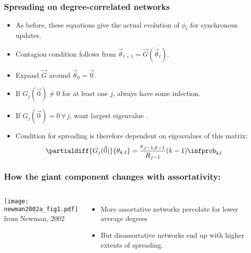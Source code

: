 \begin{frame}
  \frametitle{Spreading on degree-correlated networks}

  \begin{itemize}
  \item<1->
    As before, these equations give the actual evolution
    of $\phi_t$ for synchronous updates.
  \item<2->
    Contagion condition follows from $\vec{\theta}_{t+1} = \vec{G}(\vec{\theta}_{t})$.
  \item<3->
    Expand $\vec{G}$ around $\vec{\theta}_{0}=\vec{0}$.
  \item<5->
    If $G_j(\vec{0}) \ne 0$ for at least one $j$, always have some infection.
  \item<5->
    If $G_j(\vec{0}) = 0 \, \forall \, j$, want largest eigenvalue
    .
  \item<6-> 
    Condition for spreading is therefore
    dependent on eigenvalues of this matrix:
    $$
    \partialdiff{G_j(\vec{0})}{\theta_{k,t}} 
    = 
    \frac{e_{j-1,k-1}}{R_{j-1}}
    (k-1)
    \infprob_{k1}
    $$
\end{itemize}

\end{frame}

\begin{frame}
  \frametitle{How the giant component changes with assortativity:}

  \begin{columns}
    \texttt{[image: newman2002a\_fig1.pdf]}\\
    {\tiny from Newman, 2002\cite{newman2002a}}
    \begin{itemize}
    \item 
      More assortative networks percolate for
      lower average degrees
    \item 
      But disassortative networks end up with
      higher extents of spreading.
    \end{itemize}
  \end{columns}
\end{frame}





